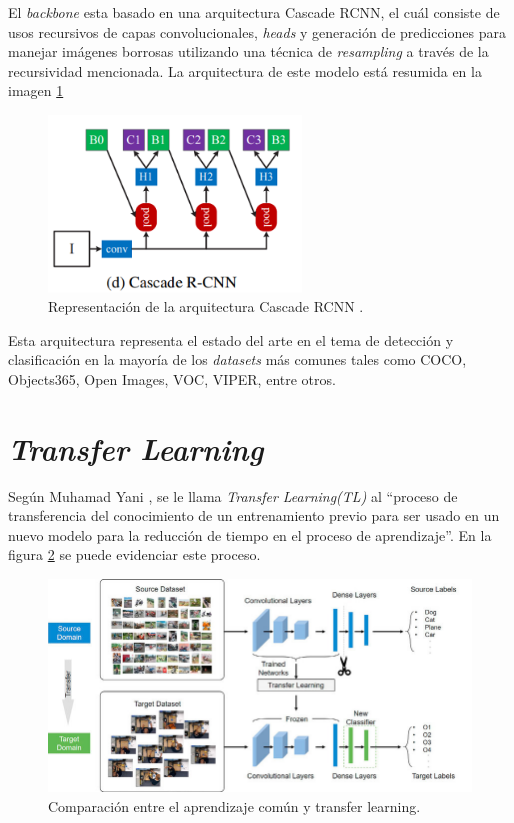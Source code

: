 El \textit{backbone} esta basado en una arquitectura Cascade RCNN, el cuál consiste de usos recursivos de capas convolucionales, \textit{heads} y generación de predicciones para manejar imágenes borrosas utilizando una técnica de \textit{resampling} a través de la recursividad mencionada. La arquitectura de este modelo está resumida en la imagen \ref{fig:cascade}

\begin{figure}[h!]
\includegraphics[width=0.6\textwidth]{images/cascadercnn.png}
\centering
\caption{Representación de la arquitectura Cascade RCNN \cite{cascadercnn}.}
\label{fig:cascade}
\end{figure}

Esta arquitectura representa el estado del arte en el tema de detección y clasificación en la 
mayoría de los \textit{datasets} más comunes tales como COCO, Objects365, Open Images, VOC, 
VIPER, entre otros.  

\section{\textit{Transfer Learning}}
Según Muhamad Yani \cite{Yani2019}, se le llama \textit{Transfer Learning(TL)} al ``proceso de  
transferencia del conocimiento de un entrenamiento previo para ser usado en un nuevo modelo para la 
reducción de tiempo en el proceso de aprendizaje''. En la figura \ref{transfer-learning} se 
puede evidenciar este proceso.\\ 

\begin{figure}[h!]
\includegraphics[width=1\textwidth]{images/transfer-learning.png}
\centering
\caption{Comparación entre el aprendizaje común y transfer learning. \cite{transfer-learning}}
\label{transfer-learning}
\end{figure}

